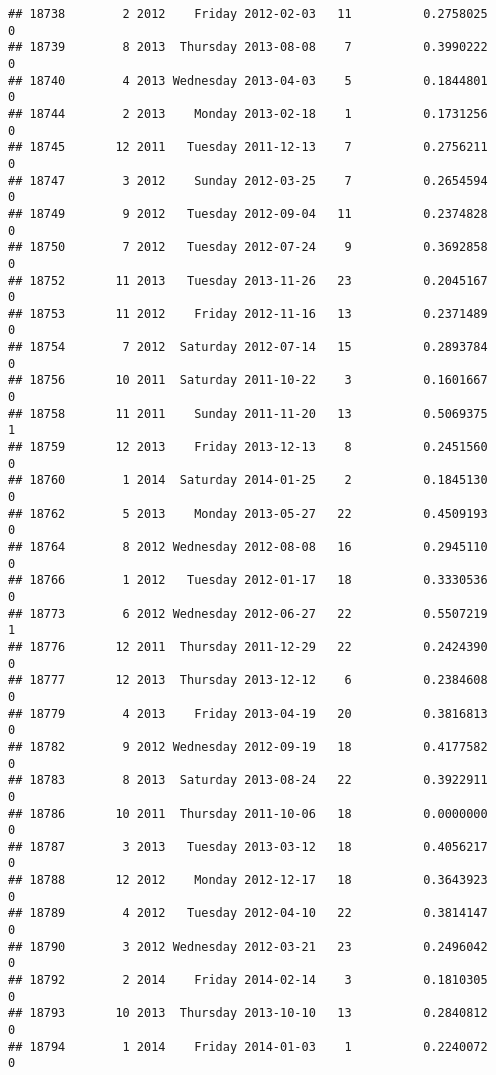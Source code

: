 \documentclass[
]{article}
\begin{document}
\begin{verbatim}
## 18738        2 2012    Friday 2012-02-03   11          0.2758025             0
## 18739        8 2013  Thursday 2013-08-08    7          0.3990222             0
## 18740        4 2013 Wednesday 2013-04-03    5          0.1844801             0
## 18744        2 2013    Monday 2013-02-18    1          0.1731256             0
## 18745       12 2011   Tuesday 2011-12-13    7          0.2756211             0
## 18747        3 2012    Sunday 2012-03-25    7          0.2654594             0
## 18749        9 2012   Tuesday 2012-09-04   11          0.2374828             0
## 18750        7 2012   Tuesday 2012-07-24    9          0.3692858             0
## 18752       11 2013   Tuesday 2013-11-26   23          0.2045167             0
## 18753       11 2012    Friday 2012-11-16   13          0.2371489             0
## 18754        7 2012  Saturday 2012-07-14   15          0.2893784             0
## 18756       10 2011  Saturday 2011-10-22    3          0.1601667             0
## 18758       11 2011    Sunday 2011-11-20   13          0.5069375             1
## 18759       12 2013    Friday 2013-12-13    8          0.2451560             0
## 18760        1 2014  Saturday 2014-01-25    2          0.1845130             0
## 18762        5 2013    Monday 2013-05-27   22          0.4509193             0
## 18764        8 2012 Wednesday 2012-08-08   16          0.2945110             0
## 18766        1 2012   Tuesday 2012-01-17   18          0.3330536             0
## 18773        6 2012 Wednesday 2012-06-27   22          0.5507219             1
## 18776       12 2011  Thursday 2011-12-29   22          0.2424390             0
## 18777       12 2013  Thursday 2013-12-12    6          0.2384608             0
## 18779        4 2013    Friday 2013-04-19   20          0.3816813             0
## 18782        9 2012 Wednesday 2012-09-19   18          0.4177582             0
## 18783        8 2013  Saturday 2013-08-24   22          0.3922911             0
## 18786       10 2011  Thursday 2011-10-06   18          0.0000000             0
## 18787        3 2013   Tuesday 2013-03-12   18          0.4056217             0
## 18788       12 2012    Monday 2012-12-17   18          0.3643923             0
## 18789        4 2012   Tuesday 2012-04-10   22          0.3814147             0
## 18790        3 2012 Wednesday 2012-03-21   23          0.2496042             0
## 18792        2 2014    Friday 2014-02-14    3          0.1810305             0
## 18793       10 2013  Thursday 2013-10-10   13          0.2840812             0
## 18794        1 2014    Friday 2014-01-03    1          0.2240072             0

\end{verbatim}
\end{document}
